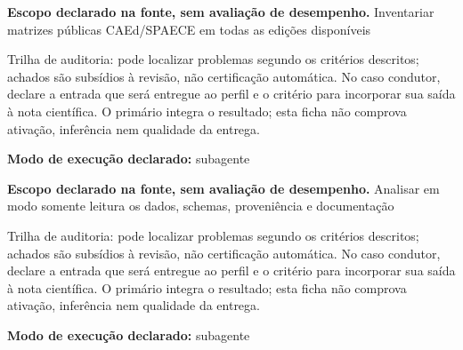 
\begin{descricao}
\textbf{Escopo declarado na fonte, sem avaliação de desempenho.}
Inventariar matrizes públicas CAEd/SPAECE em todas as edições disponíveis
\end{descricao}

\begin{funcao}
Trilha de auditoria: pode localizar problemas segundo os critérios descritos; achados são subsídios à revisão, não certificação automática. No caso condutor, declare a entrada que será entregue ao perfil e o critério para incorporar sua saída à nota científica. O primário integra o resultado; esta ficha não comprova ativação, inferência nem qualidade da entrega.
\end{funcao}

\begin{arquitetura}
\textbf{Modo de execução declarado:} subagente
\end{arquitetura}


\begin{descricao}
\textbf{Escopo declarado na fonte, sem avaliação de desempenho.}
Analisar em modo somente leitura os dados, schemas, proveniência e documentação
\end{descricao}

\begin{funcao}
Trilha de auditoria: pode localizar problemas segundo os critérios descritos; achados são subsídios à revisão, não certificação automática. No caso condutor, declare a entrada que será entregue ao perfil e o critério para incorporar sua saída à nota científica. O primário integra o resultado; esta ficha não comprova ativação, inferência nem qualidade da entrega.
\end{funcao}

\begin{arquitetura}
\textbf{Modo de execução declarado:} subagente
\end{arquitetura}

